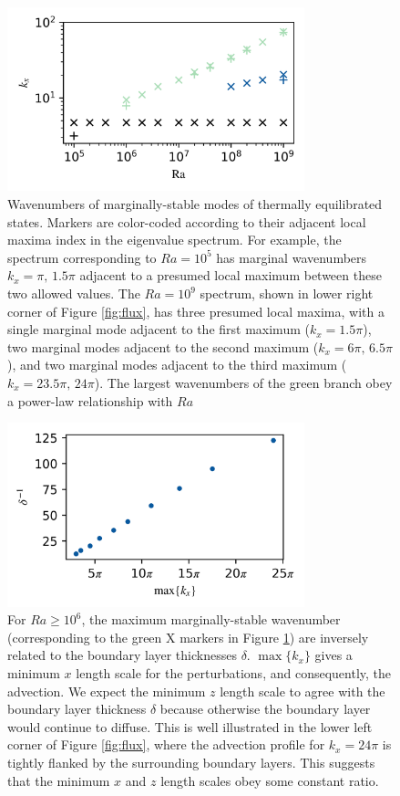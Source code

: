 \documentclass[reprint,amsmath,amssymb,aps]{revtex4-1}
\begin{document}
\begin{figure}[h]
    \centering
    \includegraphics[width=3.4in]{kx_m_ra1.png}
    \caption{Wavenumbers of marginally-stable modes of thermally equilibrated states. Markers are color-coded according to their adjacent local maxima index in the eigenvalue spectrum. For example, the spectrum corresponding to $Ra = 10^5$ has marginal wavenumbers $k_x = \pi, \, 1.5\pi$ adjacent to a presumed local maximum between these two allowed values. The $Ra = 10^9$ spectrum, shown in lower right corner of Figure \ref{fig:flux}, has three presumed local maxima, with a single marginal mode adjacent to the first maximum ($k_x = 1.5\pi$), two marginal modes adjacent to the second maximum ($k_x = 6\pi, \, 6.5\pi$), and two marginal modes adjacent to the third maximum ($k_x = 23.5\pi, \, 24\pi$). The largest wavenumbers of the green branch obey a power-law relationship with $Ra$}
    \label{fig:kx_marginals}
\end{figure}






\begin{figure}[h]
    \centering
    \includegraphics[width=3.4in]{del_kx_inv.png}
    \caption{For $Ra \geq 10^6$, the maximum marginally-stable wavenumber (corresponding to the green X markers in Figure \ref{fig:kx_marginals}) are inversely related to the boundary layer thicknesses $\delta$. $\max \{ k_x \}$ gives a minimum $x$ length scale for the perturbations, and consequently, the advection. We expect the minimum $z$ length scale to agree with the boundary layer thickness $\delta$ because otherwise the boundary layer would continue to diffuse. This is well illustrated in the lower left corner of Figure \ref{fig:flux}, where the advection profile for $k_x = 24\pi$ is tightly flanked by the surrounding boundary layers. This suggests that the minimum $x$ and $z$ length scales obey some constant ratio.}
    \label{fig:my_label}
\end{figure}
\end{document}
